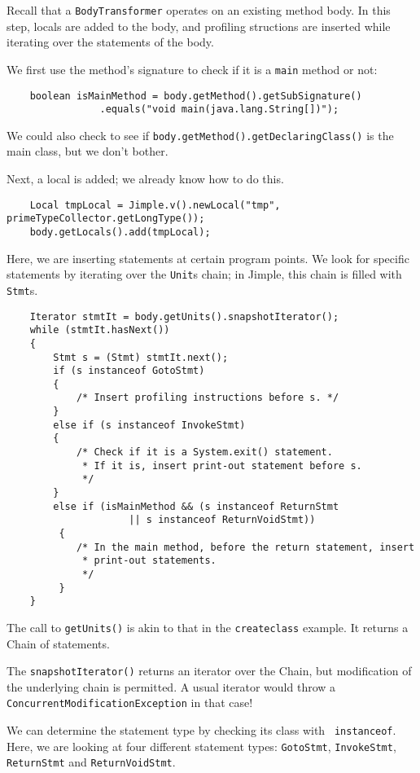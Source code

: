 \documentclass{article}
\begin{document}
Recall that a {\tt BodyTransformer} operates on an existing method
body.  In this step, locals are added to the body, and profiling structions
are inserted while iterating over the statements of the body. 

We first use the method's signature to check if it is a {\tt main}
method or not:
\begin{verbatim}
    boolean isMainMethod = body.getMethod().getSubSignature()
                .equals("void main(java.lang.String[])");
\end{verbatim}
We could also check to see if {\tt body.getMethod().getDeclaringClass()}
is the main class, but we don't bother.

Next, a local is added; we already know how to do this.
\begin{verbatim}
    Local tmpLocal = Jimple.v().newLocal("tmp", primeTypeCollector.getLongType());
    body.getLocals().add(tmpLocal);
\end{verbatim}

Here, we are inserting statements at certain program
points.  We look for specific statements by iterating over the
{\tt Unit}s chain; in Jimple, this chain is filled with {\tt Stmt}s.

\begin{verbatim}
    Iterator stmtIt = body.getUnits().snapshotIterator();
    while (stmtIt.hasNext())
    {
        Stmt s = (Stmt) stmtIt.next();
        if (s instanceof GotoStmt)
        {
            /* Insert profiling instructions before s. */
        }
        else if (s instanceof InvokeStmt)
        {
            /* Check if it is a System.exit() statement.
             * If it is, insert print-out statement before s.
             */
        }
        else if (isMainMethod && (s instanceof ReturnStmt 
                     || s instanceof ReturnVoidStmt))
         {
            /* In the main method, before the return statement, insert
             * print-out statements.
             */
         }
    }
\end{verbatim}

The call to {\tt getUnits()} is akin to that in the {\tt createclass}
example. It returns a Chain of statements. 

The {\tt snapshotIterator()} returns an iterator over the Chain,
but modification of the underlying chain is permitted.  A usual iterator
would throw a {\tt ConcurrentModificationException} in that case!

We can determine the statement type by checking its class with {\tt
instanceof}.  Here, we are looking at four different statement types:
{\tt GotoStmt}, {\tt InvokeStmt}, {\tt ReturnStmt} and {\tt ReturnVoidStmt}.
\end{document}
